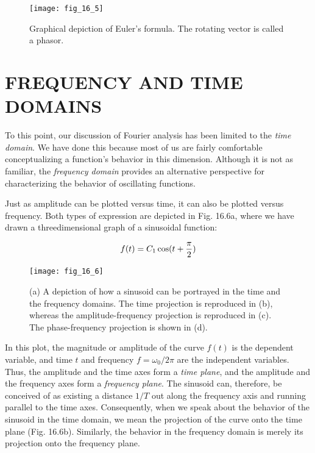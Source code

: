 \documentclass[../main.tex]{subfiles}
\begin{document}
\begin{figure}[H] %
	\centering
	\texttt{[image: fig\_16\_5]}
	\caption{\textsf{Graphical depiction of Euler's formula. The rotating vector is called a phasor.}}
	\label{fig:fig_16_5}
\end{figure}

\label{cha:cha_P_16_3} %
\section{FREQUENCY AND TIME DOMAINS}

\noindent To this point, our discussion of Fourier analysis has been limited to the \textit{time domain}. We
have done this because most of us are fairly comfortable conceptualizing a function's
behavior in this dimension. Although it is not as familiar, the \textit{frequency domain} provides an
alternative perspective for characterizing the behavior of oscillating functions.

Just as amplitude can be plotted versus time, it can also be plotted versus frequency.
Both types of expression are depicted in Fig. 16.6a, where we have drawn a threedimensional graph of a sinusoidal function:

\begin{equation}
	\notag
	f(t) = C_1 \cos(t + \frac{\pi}{2})
\end{equation} 

\begin{figure}[H] 
	\centering
	\texttt{[image: fig\_16\_6]}
	\caption{\textsf{(a) A depiction of how a sinusoid can be portrayed in the time and the frequency domains. The
	time projection is reproduced in (b), whereas the amplitude-frequency projection is reproduced in
	(c). The phase-frequency projection is shown in (d).}}
	\label{fig:fig_16_6}
\end{figure}

\noindent In this plot, the magnitude or amplitude of the curve $f(t)$ is the dependent variable, and time $t$
and frequency $f = \omega_0 / 2 \pi$ are the independent variables. Thus, the amplitude and the time
axes form a \textit{time plane}, and the amplitude and the frequency axes form a \textit{frequency plane}.
The sinusoid can, therefore, be conceived of as existing a distance $1/T$ out along the frequency axis and running parallel to the time axes. Consequently, when we speak about the
behavior of the sinusoid in the time domain, we mean the projection of the curve onto the
time plane (Fig. 16.6b). Similarly, the behavior in the frequency domain is merely its projection onto the frequency plane.
\end{document}
